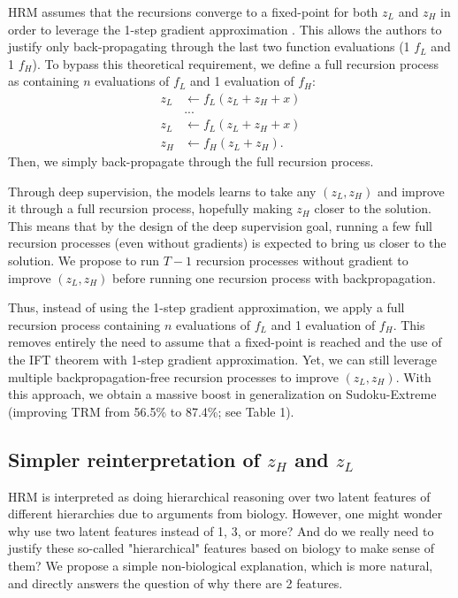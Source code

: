 \documentclass{article}
\theoremstyle{plain}
\theoremstyle{definition}
\theoremstyle{remark}
\begin{document}
HRM assumes that the recursions converge to a fixed-point for both $z_L$ and $z_H$ in order to leverage the 1-step gradient approximation \citep{bai2019deep}. This allows the authors to justify only back-propagating through the last two function evaluations (1 $f_L$ and 1 $f_H$). To bypass this theoretical requirement, we define a full recursion process as containing $n$ evaluations of $f_L$ and 1 evaluation of $f_H$:
\begin{align*}
z_L &\gets f_L\left( z_L + z_H + x \right) \\
&... \\
z_L &\gets f_L\left( z_L + z_H + x \right) \\
z_H &\gets f_H\left( z_L + z_H \right).
\end{align*}
Then, we simply back-propagate through the full recursion process. 

Through deep supervision, the models learns to take any $(z_L,z_H)$ and improve it through a full recursion process, hopefully making $z_H$ closer to the solution. This means that by the design of the deep supervision goal, running a few full recursion processes (even without gradients) is expected to bring us closer to the solution. We propose to run $T-1$ recursion processes without gradient to improve $(z_L,z_H)$ before running one recursion process with backpropagation.

Thus, instead of using the 1-step gradient approximation, we apply a full recursion process containing $n$ evaluations of $f_L$ and 1 evaluation of $f_H$. This removes entirely the need to assume that a fixed-point is reached and the use of the IFT theorem with 1-step gradient approximation. Yet, we can still leverage multiple backpropagation-free recursion processes to improve $(z_L,z_H)$. With this approach, we obtain a massive boost in generalization on Sudoku-Extreme (improving TRM from 56.5\% to 87.4\%; see Table 1).

\subsection{Simpler reinterpretation of $z_H$ and $z_L$} 

HRM is interpreted as doing hierarchical reasoning over two latent features of different hierarchies due to arguments from biology. However, one might wonder why use two latent features instead of 1, 3, or more? And do we really need to justify these so-called "hierarchical" features based on biology to make sense of them? We propose a simple non-biological explanation, which is more natural, and directly answers the question of why there are 2 features.
\end{document}

